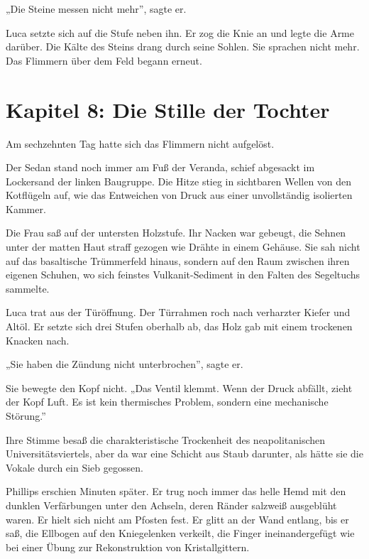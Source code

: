 \documentclass[
  ngerman,
]{article}
\begin{document}
„Die Steine messen nicht mehr'', sagte er.

Luca setzte sich auf die Stufe neben ihn. Er zog die Knie an und legte
die Arme darüber. Die Kälte des Steins drang durch seine Sohlen. Sie
sprachen nicht mehr. Das Flimmern über dem Feld begann erneut.

\section{}\label{section-3}

\section{\texorpdfstring{\textbf{Kapitel 8: Die Stille der
Tochter}}{Kapitel 8: Die Stille der Tochter}}\label{kapitel-8-die-stille-der-tochter}

Am sechzehnten Tag hatte sich das Flimmern nicht aufgelöst.

Der Sedan stand noch immer am Fuß der Veranda, schief abgesackt im
Lockersand der linken Baugruppe. Die Hitze stieg in sichtbaren Wellen
von den Kotflügeln auf, wie das Entweichen von Druck aus einer
unvollständig isolierten Kammer.

Die Frau saß auf der untersten Holzstufe. Ihr Nacken war gebeugt, die
Sehnen unter der matten Haut straff gezogen wie Drähte in einem Gehäuse.
Sie sah nicht auf das basaltische Trümmerfeld hinaus, sondern auf den
Raum zwischen ihren eigenen Schuhen, wo sich feinstes Vulkanit-Sediment
in den Falten des Segeltuchs sammelte.

Luca trat aus der Türöffnung. Der Türrahmen roch nach verharzter Kiefer
und Altöl. Er setzte sich drei Stufen oberhalb ab, das Holz gab mit
einem trockenen Knacken nach.

„Sie haben die Zündung nicht unterbrochen'', sagte er.

Sie bewegte den Kopf nicht. „Das Ventil klemmt. Wenn der Druck abfällt,
zieht der Kopf Luft. Es ist kein thermisches Problem, sondern eine
mechanische Störung.''

Ihre Stimme besaß die charakteristische Trockenheit des neapolitanischen
Universitätsviertels, aber da war eine Schicht aus Staub darunter, als
hätte sie die Vokale durch ein Sieb gegossen.

Phillips erschien Minuten später. Er trug noch immer das helle Hemd mit
den dunklen Verfärbungen unter den Achseln, deren Ränder salzweiß
ausgeblüht waren. Er hielt sich nicht am Pfosten fest. Er glitt an der
Wand entlang, bis er saß, die Ellbogen auf den Kniegelenken verkeilt,
die Finger ineinandergefügt wie bei einer Übung zur Rekonstruktion von
Kristallgittern.
\end{document}
